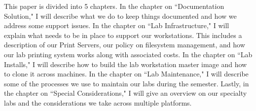 This paper is divided into 5 chapters.  In the chapter on ``Documentation Solution," I will describe what we do to keep things documented and how we address some support issues.  In the chapter on ``Lab Infrastructure," I will explain what needs to be in place to support our workstations.  This includes a description of our Print Servers, our policy on filesystem management, and how our lab printing system works along with associated costs.  In the chapter on ``Lab Installs," I will describe how to build the lab workstation master image and how to clone it across machines.  In the chapter on ``Lab Maintenance," I will describe some of the processes we use to maintain our labs during the semester.  Lastly, in the chapter on ``Special Considerations," I will give an overview on our specialty labs and the considerations we take across multiple platforms.  

